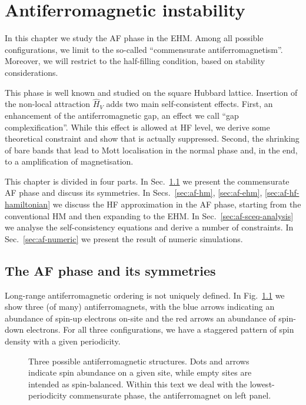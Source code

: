 \def\GraphicsFolder{chapters/antiferromagnetic-instability/pictures}
\chapter{Antiferromagnetic instability}\label{chap:af}

In this chapter we study the AF phase in the EHM. Among all possible configurations, we limit to the so-called ``commensurate antiferromagnetism''. Moreover, we will restrict to the half-filling condition, based on stability considerations. 

This phase is well known and studied on the square Hubbard lattice. Insertion of the non-local attraction $\hat H_V$ adds two main self-consistent effects. First, an enhancement of the antiferromagnetic gap, an effect we call ``gap complexification''. While this effect is allowed at HF level, we derive some theoretical constraint and show that is actually suppressed. Second, the shrinking of bare bands that lead to Mott localisation in the normal phase and, in the end, to a amplification of magnetisation.

This chapter is divided in four parts. In Sec.~\ref{sec:af-phase-theory} we present the commensurate AF phase and discuss its symmetries. In Secs.~\ref{sec:af-hm}, \ref{sec:af-ehm}, \ref{sec:af-hf-hamiltonian} we discuss the HF approximation in the AF phase, starting from the conventional HM and then expanding to the EHM. In Sec.~\ref{sec:af-sceq-analysis} we analyse the self-consistency equations and derive a number of constraints. In Sec.~\ref{sec:af-numeric} we present the result of numeric simulations.

\section{The AF phase and its symmetries}\label{sec:af-phase-theory}

Long-range antiferromagnetic ordering is not uniquely defined. In Fig.~\ref{fig:antiferromagnets} we show three (of many) antiferromagnets, with the blue arrows indicating an abundance of spin-up electrons on-site and the red arrows an abundance of spin-down electrons. For all three configurations, we have a staggered pattern of spin density with a given periodicity.

\begin{figure}
	\centering
	
	\caption{Three possible antiferromagnetic structures. Dots and arrows indicate spin abundance on a given site, while empty sites are intended as spin-balanced. Within this text we deal with the lowest-periodicity commensurate phase, the antiferromagnet on left panel.}
	\label{fig:antiferromagnets}
\end{figure}

